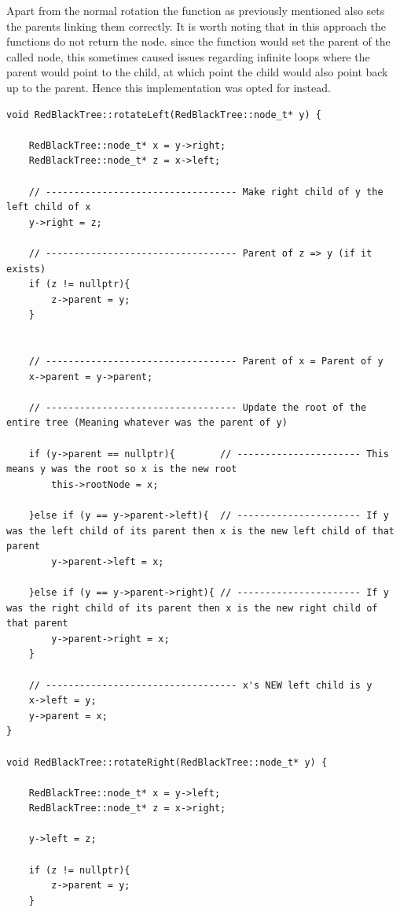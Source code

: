 \documentclass[12pt, a4paper]{report}
\begin{document}
Apart from the normal rotation the function as previously mentioned also sets the parents linking them correctly. It is worth noting that in this approach the functions do not return the node. since the function would set the parent of the called node, this sometimes caused issues regarding infinite loops where the parent would point to the child, at which point the child would also point back up to the parent. Hence this implementation was opted for instead.
\begin{verbatim}
void RedBlackTree::rotateLeft(RedBlackTree::node_t* y) {
    
    RedBlackTree::node_t* x = y->right;
    RedBlackTree::node_t* z = x->left;
    
    // ---------------------------------- Make right child of y the left child of x
    y->right = z;
    
    // ---------------------------------- Parent of z => y (if it exists)
    if (z != nullptr){
        z->parent = y;
    }

    
    // ---------------------------------- Parent of x = Parent of y
    x->parent = y->parent;
    
    // ---------------------------------- Update the root of the entire tree (Meaning whatever was the parent of y)
    
    if (y->parent == nullptr){        // ---------------------- This means y was the root so x is the new root
        this->rootNode = x;
    
    }else if (y == y->parent->left){  // ---------------------- If y was the left child of its parent then x is the new left child of that parent
        y->parent->left = x;

    }else if (y == y->parent->right){ // ---------------------- If y was the right child of its parent then x is the new right child of that parent
        y->parent->right = x;
    }
    
    // ---------------------------------- x's NEW left child is y
    x->left = y;
    y->parent = x;
}

void RedBlackTree::rotateRight(RedBlackTree::node_t* y) {

    RedBlackTree::node_t* x = y->left;
    RedBlackTree::node_t* z = x->right;
    
    y->left = z;
    
    if (z != nullptr){
        z->parent = y;
    }


\end{verbatim}
\end{document}
